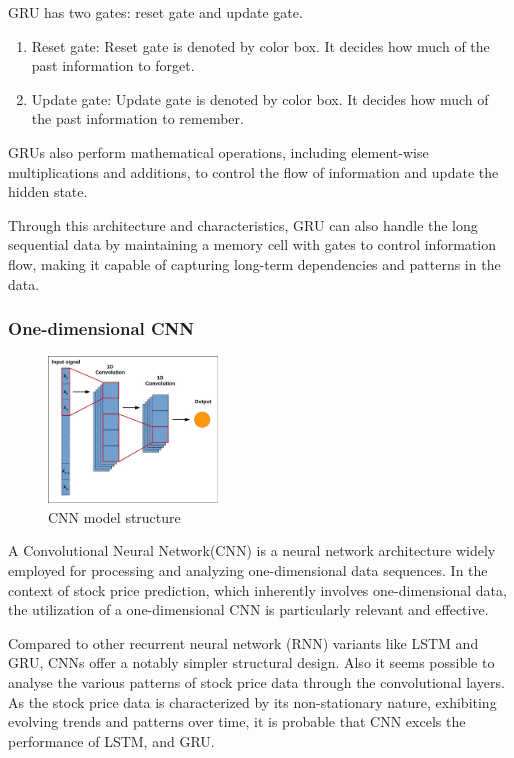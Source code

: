 GRU has two gates: reset gate and update gate.
\begin{enumerate}
	\item Reset gate: Reset gate is denoted by color box. It decides how much of the past information to forget.
	\item Update gate: Update gate is denoted by color box. It decides how much of the past information to remember.
\end{enumerate}

GRUs also perform mathematical operations, including element-wise multiplications and additions, to control the flow of information and update the hidden state.

Through this architecture and characteristics, GRU can also handle the long sequential data by maintaining a memory cell with gates to control information flow, 
making it capable of capturing long-term dependencies and patterns in the data.


\subsubsection{One-dimensional CNN}

\begin{figure}
	\includegraphics[width=0.4\textwidth]{Fig/CNN.jpg}
	\caption{CNN model structure}
\end{figure}
A Convolutional Neural Network(CNN) is a neural network architecture widely employed for processing and analyzing one-dimensional data sequences. 
In the context of stock price prediction, which inherently involves one-dimensional data, the utilization of a one-dimensional CNN is particularly relevant and effective.

Compared to other recurrent neural network (RNN) variants like LSTM and GRU, CNNs offer a notably simpler structural design. 
Also it seems possible to analyse the various patterns of stock price data through the convolutional layers.
As the stock price data is characterized by its non-stationary nature, exhibiting evolving trends and patterns over time, 
it is probable that CNN excels the performance of LSTM, and GRU.

